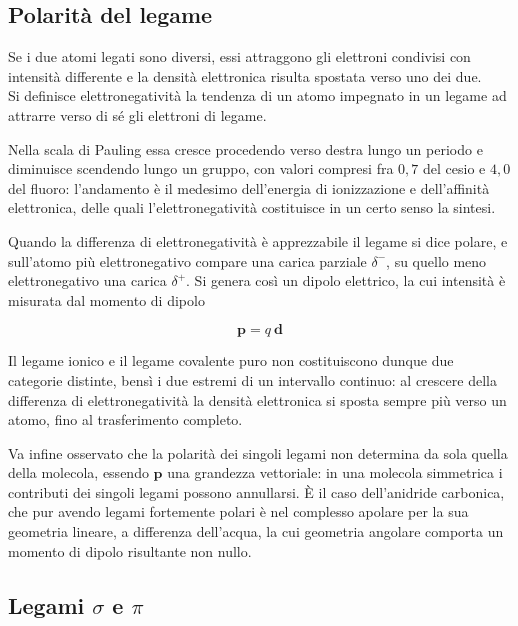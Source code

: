 \subsection{Polarità del legame}

Se i due atomi legati sono diversi, essi attraggono gli elettroni condivisi con
intensità differente e la densità elettronica risulta spostata verso uno dei
due.\\

Si definisce elettronegatività la tendenza di un atomo impegnato in un legame ad attrarre verso di sé gli elettroni di legame.

Nella scala di Pauling essa cresce procedendo verso destra lungo un periodo e diminuisce scendendo lungo un gruppo, con valori compresi fra $0,7$ del cesio e $4,0$ del fluoro: l'andamento è il medesimo dell'energia di ionizzazione e dell'affinità elettronica, delle quali l'elettronegatività costituisce in un certo senso la sintesi.

Quando la differenza di elettronegatività è apprezzabile il legame si dice polare, e sull'atomo più elettronegativo compare una carica parziale $\delta^-$, su quello meno elettronegativo una carica $\delta^+$. 
Si genera così un dipolo elettrico, la cui intensità è misurata dal momento di dipolo

\begin{equation}
    \mathbf{p} = q \ \mathbf{d}
    \label{eq:dipolo}
\end{equation}

Il legame ionico e il legame covalente puro non costituiscono dunque due categorie distinte, bensì i due estremi di un intervallo continuo: al crescere della differenza di elettronegatività la densità elettronica si sposta sempre più verso un atomo, fino al trasferimento completo.

Va infine osservato che la polarità dei singoli legami non determina da sola quella della molecola, essendo $\mathbf{p}$ una grandezza vettoriale: in una molecola simmetrica i contributi dei singoli legami possono annullarsi. 
È il caso dell'anidride carbonica, che pur avendo legami fortemente polari è nel complesso apolare per la sua geometria lineare, a differenza dell'acqua, la cui geometria angolare comporta un momento di dipolo risultante non nullo.

\subsection{Legami $\sigma$ e $\pi$}

